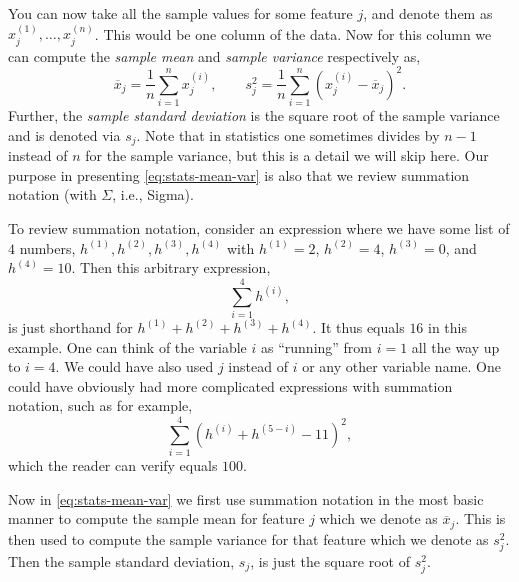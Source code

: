 You can now take all the sample values for some feature $j$, and denote them as $x_j^{(1)}, \ldots, x_j^{(n)}$. This would be one column of the data.  
Now for this column we can compute the \textit{sample mean} and \textit{sample variance} respectively as,
%
\begin{equation}
\label{eq:stats-mean-var}
\overline{x}_j = \frac{1}{n} \sum_{i=1}^n x_j^{(i)},
\qquad
s^2_j = \frac{1}{n} \sum_{i=1}^n (x_j^{(i)} - \overline{x}_j)^2.
\end{equation}
%
Further, the \textit{sample standard deviation} is the square root of the sample variance and is denoted via $s_j$. Note that in statistics one sometimes divides by $n-1$ instead of $n$ for the sample variance, but this is a detail we will skip here. Our purpose in presenting \eqref{eq:stats-mean-var} is also that we review summation notation (with $\Sigma$, i.e., Sigma).

To review summation notation, consider an expression where we have some list of $4$ numbers, $h^{(1)}, h^{(2)}, h^{(3)}, h^{(4)}$ with $h^{(1)} = 2$, $h^{(2)} = 4$, $h^{(3)} = 0$, and $h^{(4)} = 10$. Then this arbitrary expression,
%
\begin{equation}
\label{eq:4-summation}
\sum_{i=1}^4 h^{(i)},
\end{equation}
%
is just shorthand for $h^{(1)} +h^{(2)} +h^{(3)} +h^{(4)}$. It thus equals $16$ in this example. One can think of the variable $i$ as ``running'' from $i=1$ all the way up to $i=4$. We could have also used $j$ instead of $i$ or any other variable name. One could have obviously had more complicated expressions with summation notation, such as for example,
%
\begin{equation}
\label{eq:4-summation-advc}
\sum_{i=1}^4 (h^{(i)} +h^{(5-i)} - 11)^2,
\end{equation}
%
which the reader can verify equals $100$.

Now in \eqref{eq:stats-mean-var} we first use summation notation in the most basic manner to compute the sample mean for feature $j$ which we denote as $\overline{x}_j$. This is then used to compute the sample variance for that feature which we denote as $s_j^2$. Then the sample standard deviation, $s_j$, is just the square root of $s_j^2$.

